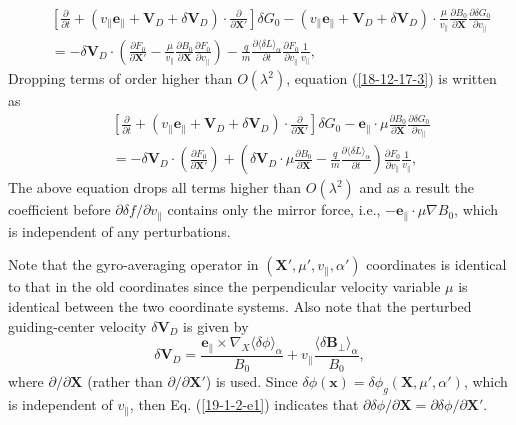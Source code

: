 \documentclass{llncs}
\begin{document}
\begin{eqnarray}
  &  & \left[ \frac{\partial}{\partial t} + (v_{\parallel}
  \mathbf{e}_{\parallel} +\mathbf{V}_D + \delta \mathbf{V}_D) \cdot
  \frac{\partial}{\partial \mathbf{X}'} \right] \delta G_0 - (v_{\parallel}
  \mathbf{e}_{\parallel} +\mathbf{V}_D + \delta \mathbf{V}_D) \cdot
  \frac{\mu}{v_{\parallel}}  \frac{\partial B_0}{\partial \mathbf{X}}
  \frac{\partial \delta G_0}{\partial v_{\parallel}} \nonumber\\
  &  & = - \delta \mathbf{V}_D \cdot \left( \frac{\partial F_0}{\partial
  \mathbf{X}'} - \frac{\mu}{v_{\parallel}}  \frac{\partial B_0}{\partial
  \mathbf{X}} \frac{\partial F_0}{\partial v_{\parallel}} \right) -
  \frac{q}{m}  \frac{\partial \langle \delta L \rangle_{\alpha}}{\partial t} 
  \frac{\partial F_0}{\partial v_{\parallel}}  \frac{1}{v_{\parallel}}, 
  \label{18-12-17-3}
\end{eqnarray}
Dropping terms of order higher than $O (\lambda^2)$, equation
(\ref{18-12-17-3}) is written as
\begin{eqnarray}
  &  & \left[ \frac{\partial}{\partial t} + (v_{\parallel}
  \mathbf{e}_{\parallel} +\mathbf{V}_D + \delta \mathbf{V}_D) \cdot
  \frac{\partial}{\partial \mathbf{X}'} \right] \delta G_0
  -\mathbf{e}_{\parallel} \cdot \mu \frac{\partial B_0}{\partial \mathbf{X}}
  \frac{\partial \delta G_0}{\partial v_{\parallel}} \nonumber\\
  &  & = - \delta \mathbf{V}_D \cdot \left( \frac{\partial F_0}{\partial
  \mathbf{X}'} \right) + \left( \delta \mathbf{V}_D \cdot \mu \frac{\partial
  B_0}{\partial \mathbf{X}} - \frac{q}{m}  \frac{\partial \langle \delta L
  \rangle_{\alpha}}{\partial t} \right)  \frac{\partial F_0}{\partial
  v_{\parallel}}  \frac{1}{v_{\parallel}}, 
\end{eqnarray}
The above equation drops all terms higher than $O (\lambda^2)$ and as a result
the coefficient before $\partial \delta f / \partial v_{\parallel}$ contains
only the mirror force, i.e., $-\mathbf{e}_{\parallel} \cdot \mu \nabla B_0$,
which is independent of any perturbations.

Note that the gyro-averaging operator in $(\mathbf{X}', \mu', v_{\parallel},
\alpha')$ coordinates is identical to that in the old coordinates since the
perpendicular velocity variable $\mu$ is identical between the two coordinate
systems. Also note that the perturbed guiding-center velocity $\delta
\mathbf{V}_D$ is given by
\begin{equation}
  \delta \mathbf{V}_D = \frac{\mathbf{e}_{\parallel} \times \nabla_X \langle
  \delta \phi \rangle_{\alpha}}{B_0} + v_{\parallel} \frac{\langle \delta
  \mathbf{B}_{\perp} \rangle_{\alpha}}{B_0},
\end{equation}
where $\partial / \partial \mathbf{X}$ (rather than $\partial / \partial
\mathbf{X}'$) is used. Since $\delta \phi (\mathbf{x}) = \delta \phi_g
(\mathbf{X}, \mu', \alpha')$, which is independent of $v_{\parallel}$, then
Eq. (\ref{19-1-2-e1}) indicates that $\partial \delta \phi / \partial
\mathbf{X}= \partial \delta \phi / \partial \mathbf{X}'$.
\end{document}
